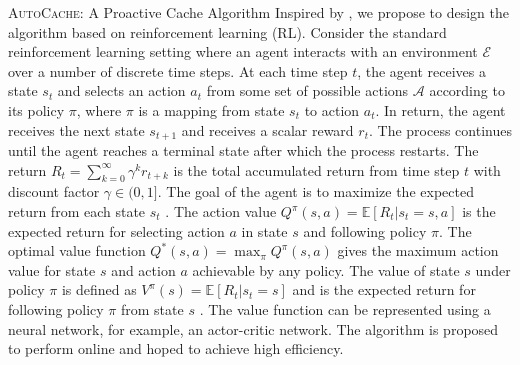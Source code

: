 \documentclass{article}
\begin{document}
\begin{section}{\textsc{AutoCache}: A Proactive Cache Algorithm}
    Inspired by \cite{Pensieve}, we propose to design the algorithm based on reinforcement learning (RL). Consider the standard reinforcement learning setting where an agent interacts with an environment $\mathcal{E}$ over a number of discrete time steps. At each time step $t$, the agent receives a state $s_t$ and selects an action $a_t$ from some set of possible actions $\mathcal{A}$ according to its policy $\pi$, where $\pi$ is a mapping from state $s_t$ to action $a_t$. In return, the agent receives the next state $s_{t+1}$ and receives a scalar reward $r_t$. The process continues until the agent reaches a terminal state after which the process restarts. The return $R_t=\sum_{k=0}^{\infty}\gamma^k r_{t+k}$ is the total accumulated return from time step $t$ with discount factor $\gamma\in(0,1]$. The goal of the agent is to maximize the expected return from each state $s_t$ \cite{rl-intro}. The action value $Q^{\pi}(s,a)=\mathbb{E}[R_t|s_t=s,a]$ is the expected return for selecting action $a$ in state $s$ and following policy $\pi$. The optimal value function $Q^*(s,a)=\max_{\pi}Q^{\pi}(s,a)$ gives the maximum action value for state $s$ and action $a$ achievable by any policy. The value of state $s$ under policy $\pi$ is defined as $V^{\pi}(s)=\mathbb{E}[R_t|s_t=s]$ and is the expected return for following policy $\pi$ from state $s$ \cite{DBLP:journals/corr/MnihBMGLHSK16}. The value function can be represented using a neural network, for example, an actor-critic network. The algorithm is proposed to perform online and hoped to achieve high efficiency.
\end{section}
\end{document}
